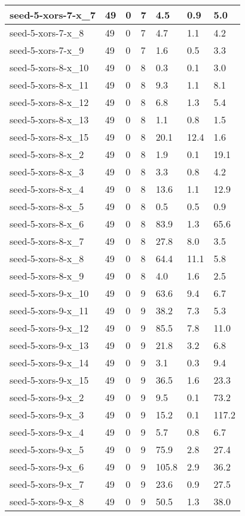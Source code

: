 \begin{scriptsize}
\begin{longtable}{|p{5cm}|l|l|l|l|l|l|}
seed-5-xors-7-x\_7&49&0&7&4.5&0.9&5.0 \\ \hline 
seed-5-xors-7-x\_8&49&0&7&4.7&1.1&4.2 \\ \hline 
seed-5-xors-7-x\_9&49&0&7&1.6&0.5&3.3 \\ \hline 
seed-5-xors-8-x\_10&49&0&8&0.3&0.1&3.0 \\ \hline 
seed-5-xors-8-x\_11&49&0&8&9.3&1.1&8.1 \\ \hline 
seed-5-xors-8-x\_12&49&0&8&6.8&1.3&5.4 \\ \hline 
seed-5-xors-8-x\_13&49&0&8&1.1&0.8&1.5 \\ \hline 
seed-5-xors-8-x\_15&49&0&8&20.1&12.4&1.6 \\ \hline 
seed-5-xors-8-x\_2&49&0&8&1.9&0.1&19.1 \\ \hline 
seed-5-xors-8-x\_3&49&0&8&3.3&0.8&4.2 \\ \hline 
seed-5-xors-8-x\_4&49&0&8&13.6&1.1&12.9 \\ \hline 
seed-5-xors-8-x\_5&49&0&8&0.5&0.5&0.9 \\ \hline 
seed-5-xors-8-x\_6&49&0&8&83.9&1.3&65.6 \\ \hline 
seed-5-xors-8-x\_7&49&0&8&27.8&8.0&3.5 \\ \hline 
seed-5-xors-8-x\_8&49&0&8&64.4&11.1&5.8 \\ \hline 
seed-5-xors-8-x\_9&49&0&8&4.0&1.6&2.5 \\ \hline 
seed-5-xors-9-x\_10&49&0&9&63.6&9.4&6.7 \\ \hline 
seed-5-xors-9-x\_11&49&0&9&38.2&7.3&5.3 \\ \hline 
seed-5-xors-9-x\_12&49&0&9&85.5&7.8&11.0 \\ \hline 
seed-5-xors-9-x\_13&49&0&9&21.8&3.2&6.8 \\ \hline 
seed-5-xors-9-x\_14&49&0&9&3.1&0.3&9.4 \\ \hline 
seed-5-xors-9-x\_15&49&0&9&36.5&1.6&23.3 \\ \hline 
seed-5-xors-9-x\_2&49&0&9&9.5&0.1&73.2 \\ \hline 
seed-5-xors-9-x\_3&49&0&9&15.2&0.1&117.2 \\ \hline 
seed-5-xors-9-x\_4&49&0&9&5.7&0.8&6.7 \\ \hline 
seed-5-xors-9-x\_5&49&0&9&75.9&2.8&27.4 \\ \hline 
seed-5-xors-9-x\_6&49&0&9&105.8&2.9&36.2 \\ \hline 
seed-5-xors-9-x\_7&49&0&9&23.6&0.9&27.5 \\ \hline 
seed-5-xors-9-x\_8&49&0&9&50.5&1.3&38.0 \\ \hline 

\end{longtable}
\end{scriptsize}
